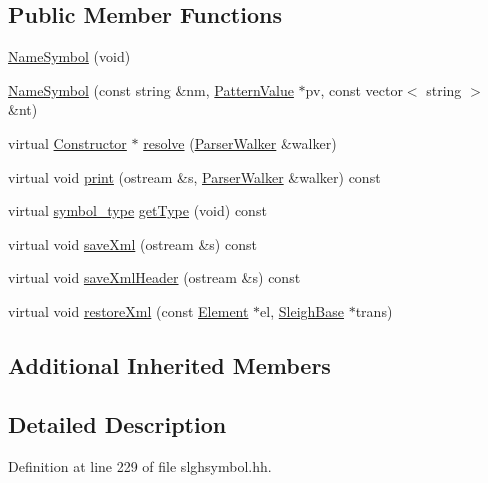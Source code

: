 \subsection*{Public Member Functions}
\begin{DoxyCompactItemize}
\item 
\mbox{\hyperlink{class_name_symbol_a7ce4d313e2b7f9d88f99dbc74a85f1b0}{Name\+Symbol}} (void)
\item 
\mbox{\hyperlink{class_name_symbol_aba5507b31019202220bd81fd7e8e9487}{Name\+Symbol}} (const string \&nm, \mbox{\hyperlink{class_pattern_value}{Pattern\+Value}} $\ast$pv, const vector$<$ string $>$ \&nt)
\item 
virtual \mbox{\hyperlink{class_constructor}{Constructor}} $\ast$ \mbox{\hyperlink{class_name_symbol_aad6d2abf3eaaeb6c92bc2a2b7f4c0a4c}{resolve}} (\mbox{\hyperlink{class_parser_walker}{Parser\+Walker}} \&walker)
\item 
virtual void \mbox{\hyperlink{class_name_symbol_a611940036621c526ec59691bc8a749bb}{print}} (ostream \&s, \mbox{\hyperlink{class_parser_walker}{Parser\+Walker}} \&walker) const
\item 
virtual \mbox{\hyperlink{class_sleigh_symbol_aba70f7f332fd63488c5ec4bd7807db41}{symbol\+\_\+type}} \mbox{\hyperlink{class_name_symbol_a348f7c9857b32717e9ac62c231108686}{get\+Type}} (void) const
\item 
virtual void \mbox{\hyperlink{class_name_symbol_a0f97f18cff09e4c67e8bb8d54c392031}{save\+Xml}} (ostream \&s) const
\item 
virtual void \mbox{\hyperlink{class_name_symbol_a6579b3f6516743c8ba34aa2e86429a14}{save\+Xml\+Header}} (ostream \&s) const
\item 
virtual void \mbox{\hyperlink{class_name_symbol_a3ff5b56a8a5cfd2e009cc5c9e8a49e97}{restore\+Xml}} (const \mbox{\hyperlink{class_element}{Element}} $\ast$el, \mbox{\hyperlink{class_sleigh_base}{Sleigh\+Base}} $\ast$trans)
\end{DoxyCompactItemize}
\subsection*{Additional Inherited Members}


\subsection{Detailed Description}


Definition at line 229 of file slghsymbol.\+hh.



